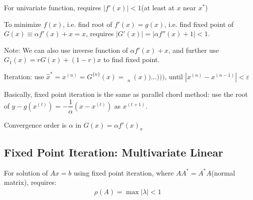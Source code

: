    For univariate function, requires $ |f'(x)|<1 $(at least at $ x $ near $ x^* $)

    To minimize $ f(x) $, i.e. find root of $ f'(x)=g(x) $, i.e. find fixed point of $ G(x)\equiv \alpha f'(x)+x=x $, requires $ |G'(x)|=|\alpha f''(x)+1|<1 $.

    Note: We can also use inverse function of $ \alpha f'(x)+x $, and further use $ G_1(x)=rG(x)+(1-r)x $ to find fixed point.

    Iteration: use $ \hat{x}^*=x^{(n)}= G^{\{n\}}(x)=\mathop{\underbrace{G(G(G(\ldots G(G}}\limits_{n}(x))\ldots ))) $, until $ |x^{(n)}-x^{(n-1)}|<\varepsilon  $

    Basically, fixed point iteration is the same as parallel chord method: use the root of $ y-g(x^{(t)})=-\dfrac{1}{\alpha } (x-x^{(t)}) $ as $ x^{(t+1)} $.

    Convergence order is $ \alpha  $ in $ G(x)=\alpha f'(x)_x $


\subsection{Fixed Point Iteration: Multivariate Linear}
    For solution of $ Ax=b $ using fixed point iteration, where $ AA^*=A^*A $(normal matrix), requires:
    \begin{align}
        \rho (A)=\max|\lambda |<1 
    \end{align}
    
